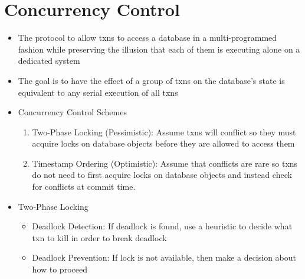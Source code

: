 \documentclass[11pt]{article}
\begin{document}
\section{Concurrency Control}
\begin{itemize}
    \item The protocol to allow txns to access a database in a multi-programmed fashion while preserving the illusion that each of them is executing alone on a dedicated system
    \item The goal is to have the effect of a group of txns on the database's state is equivalent to any serial execution of all txns
    \item Concurrency Control Schemes
    \begin{enumerate}
        \item Two-Phase Locking (Pessimistic): Assume txns will conflict so they must acquire locks on database objects before they are allowed to access them
        \item Timestamp Ordering (Optimistic): Assume that conflicts are rare so txns do not need to first acquire locks on database objects and instead check for
conflicts at commit time.
    \end{enumerate}
    \item Two-Phase Locking
    \begin{itemize}
        \item Deadlock Detection: If deadlock is found, use a heuristic to decide what txn to kill in order to break deadlock
        \item Deadlock Prevention: If lock is not available, then make a decision about how to proceed
    \end{itemize}
\end{itemize}
\end{document}
